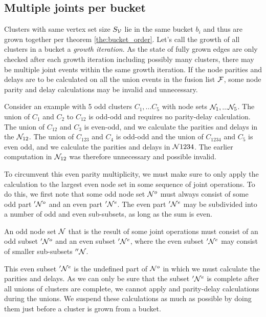 \subsection{Multiple joints per bucket}

Clusters with same vertex set size $S_{\mathcal{V}}$ lie in the same bucket $b_i$ and thus are grown together per theorem \ref{the:bucket_order}. Let's call the growth of all clusters in a bucket a \emph{growth iteration}. As the state of fully grown edges are only checked after each growth iteration including possibly many clusters, there may be multiple joint events within the same growth iteration. If the node parities and delays are to be calculated on all the union events in the fusion list $\mathcal{F}$, some node parity and delay calculations may be invalid and unnecessary.

Consider an example with 5 odd clusters $C_1, ... C_5$ with node sets $\mathcal{N}_1, ... \mathcal{N}_5$. The union of $C_1$ and $C_2$ to $C_{12}$ is odd-odd and requires no parity-delay calculation. The union of $C_{12}$ and $C_3$ is even-odd, and we calculate the parities and delays in the $\mathcal{N}_{12}$. The union of $C_{123}$ and $C_4$ is odd-odd and the union of $C_{1234}$ and $C_5$ is even odd, and we calculate the parities and delays in $\mathcal{N}{1234}$. The earlier computation in $\mathcal{N}_{12}$ was therefore unnecessary and possible invalid.

To circumvent this even parity multiplicity, we must make sure to only apply the calculation to the largest even node set in some sequence of joint operations. To do this, we first note that some odd node set $\mathcal{N}^o$ must always consist of some odd part $'\mathcal{N}^o$ and an even part $'\mathcal{N}^e$. The even part $'\mathcal{N}^e$ may be subdivided into a number of odd and even sub-subsets, as long as the sum is even.
\begin{lemma}\label{lem:oddisevenodd}
  An odd node set $\mathcal{N}$ that is the result of some joint operations must consist of an odd subset $'\mathcal{N}^o$ and an even subset $'\mathcal{N}^e$, where the even subset $'\mathcal{N}^e$ may consist of smaller sub-subsets $''\mathcal{N}$.
\end{lemma}
This even subset $'\mathcal{N}^e$ is the undefined part of $\mathcal{N}^o$ in which we must calculate the parities and delays. As we can only be sure that the subset $'\mathcal{N}^e$ is complete after all unions of clusters are complete, we cannot apply and parity-delay calculations during the unions. We suspend these calculations as much as possible by doing them just before a cluster is grown from a bucket.


